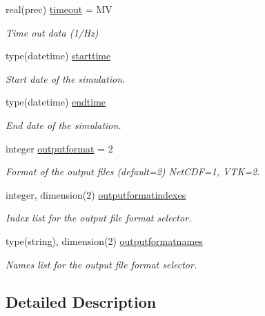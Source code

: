 \begin{DoxyCompactItemize}
real(prec) \mbox{\hyperlink{structsimulation__globals__mod_1_1parameters__t_af4190961e6191cf07a9b04b0b864ec95}{timeout}} = MV
\begin{DoxyCompactList}\small\item\em Time out data (1/\+Hz) \end{DoxyCompactList}\item 
type(datetime) \mbox{\hyperlink{structsimulation__globals__mod_1_1parameters__t_a8e3abdcb1022685a07ca65c3c6a50203}{starttime}}
\begin{DoxyCompactList}\small\item\em Start date of the simulation. \end{DoxyCompactList}\item 
type(datetime) \mbox{\hyperlink{structsimulation__globals__mod_1_1parameters__t_a79f52ac6e24e87eba3c809d97d647aaf}{endtime}}
\begin{DoxyCompactList}\small\item\em End date of the simulation. \end{DoxyCompactList}\item 
integer \mbox{\hyperlink{structsimulation__globals__mod_1_1parameters__t_a273c18519d8ed85697a0143f2bf26289}{outputformat}} = 2
\begin{DoxyCompactList}\small\item\em Format of the output files (default=2) Net\+C\+DF=1, V\+TK=2. \end{DoxyCompactList}\item 
integer, dimension(2) \mbox{\hyperlink{structsimulation__globals__mod_1_1parameters__t_a654359ea7dff5a8a0d57276f44e589b1}{outputformatindexes}}
\begin{DoxyCompactList}\small\item\em Index list for the output file format selector. \end{DoxyCompactList}\item 
type(string), dimension(2) \mbox{\hyperlink{structsimulation__globals__mod_1_1parameters__t_a8bffd480a278698179e8581a1fdf3c08}{outputformatnames}}
\begin{DoxyCompactList}\small\item\em Names list for the output file format selector. \end{DoxyCompactList}\end{DoxyCompactItemize}


\subsection{Detailed Description}


